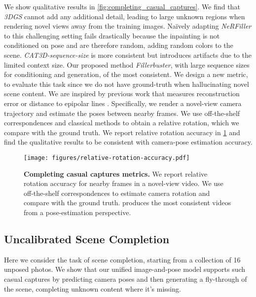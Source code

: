 %
We show qualitative results in \cref{fig:completing_casual_captures}.
We find that \textit{3DGS} cannot add any additional detail, leading to large unknown regions when rendering novel views away from the training images.
Naïvely adapting \textit{NeRFiller} to this challenging setting fails drastically because the inpainting is not conditioned on pose and are therefore random, adding random colors to the scene.
\textit{CAT3D-sequence-size} is more consistent but introduces artifacts due to the limited context size.
Our proposed method \textit{Fillerbuster}, with large sequence sizes for conditioning and generation, of the most consistent.
We design a new metric, to evaluate this task since we do not have ground-truth when hallucinating novel scene content.
We are inspired by previous work that measures reconstruction error \cite{fridman2024scenescape} or distance to epipolar lines \cite{muller2024multidiff,yu2023long}.
Specifically, we render a novel-view camera trajectory and estimate the poses between nearby frames.
We use off-the-shelf correspondences \cite{sun2021loftr} and classical methods \cite{hartley1997defense} to obtain a relative rotation, which we compare with the ground truth.
We report relative rotation accuracy in \cref{fig:completing_casual_captures_metrics} and find the qualitative results to be consistent with camera-pose estimation accuracy.

\begin{figure}[t]
\centering
\texttt{[image: figures/relative-rotation-accuracy.pdf]}\vspace{-0.5em}
\caption{\label{fig:completing_casual_captures_metrics}%
    \textbf{Completing casual captures metrics.}
    We report relative rotation accuracy for nearby frames in a novel-view video.
    We use off-the-shelf correspondences \cite{sun2021loftr}
    to estimate camera rotation and compare with the ground truth.
    \method{} produces the most consistent videos from a pose-estimation perspective.
    \vspace{-1em}
}
\end{figure}


\subsection{Uncalibrated Scene Completion}

Here we consider the task of scene completion, starting from a collection of 16 unposed photos.
We show that our unified image-and-pose model supports such casual captures by predicting camera poses and then generating a fly-through of the scene, completing unknown content where it's missing.

